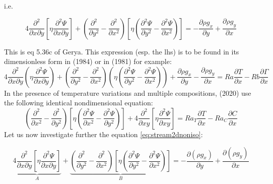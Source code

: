i.e.
\begin{mdframed}[backgroundcolor=blue!5]
\begin{equation}
4\frac{\partial^2 }{\partial x \partial y} 
\left[\eta \frac{\partial^2 \Psi}{\partial x \partial y}  \right]
+ 
\left( 
\frac{\partial^2 }{\partial y^2}
- \frac{\partial^2 }{\partial x^2}
\right)
\left[ \eta (\frac{\partial^2 \Psi}{\partial y^2}-\frac{\partial^2 \Psi}{\partial x^2}) \right]
=
- \frac{\partial \rho g_x}{\partial y}
+ \frac{\partial \rho g_y}{\partial x}
\label{eq:stream2dnoniso}
\end{equation}
\end{mdframed}
This is eq 5.36c of Gerya. 
This expression (esp. the lhs) is to be found in its dimensionless form in 
\textcite{chyu84} (1984) or in \textcite{scja81} (1981) for example:
\[
4\frac{\partial^2 }{\partial x \partial y} 
\left(\eta \frac{\partial^2 \Psi}{\partial x \partial y} 
\right)
+ 
\left( 
\frac{\partial^2 }{\partial y^2}
- \frac{\partial^2 }{\partial x^2}
\right)
\left( \eta (\frac{\partial^2 \Psi}{\partial y^2}-\frac{\partial^2 \Psi}{\partial x^2}) \right)
+ \frac{\partial \rho g_x}{\partial y}
- \frac{\partial \rho g_y}{\partial x}
=
Ra \frac{\partial T}{\partial x}
-Rb \frac{\partial \Gamma}{\partial x}
\]
In the presence of temperature variations and multiple compositions, 
\textcite{trlb20} (2020)  use the  following identical nondimensional equation:
\[
\left(
\frac{\partial^2 }{\partial x^2} - 
\frac{\partial^2 }{\partial y^2}  
\right)
\left[ \eta
\left(
\frac{\partial^2 \Psi}{\partial x^2} - 
\frac{\partial^2 \Psi}{\partial y^2}  
\right)
\right]
+4
\frac{\partial^2 }{\partial xy} 
\left[
\eta 
\frac{\partial^2 \Psi}{\partial xy} 
\right]
=
Ra_T \frac{\partial T}{\partial x}-
Ra_C \frac{\partial C}{\partial x}
\]
Let us now investigate further the equation \eqref{eq:stream2dnoniso}:

\[
\underbrace{
4\frac{\partial^2 }{\partial x \partial y} 
\left[\eta \frac{\partial^2 \Psi}{\partial x \partial y}  \right]}_{A}
+ 
\underbrace{
\left( 
\frac{\partial^2 }{\partial y^2}
- \frac{\partial^2 }{\partial x^2}
\right)
\left[ \eta (\frac{\partial^2 \Psi}{\partial y^2}-\frac{\partial^2 \Psi}{\partial x^2}) \right]}_{B}
=
- \frac{\partial (\rho g_x)}{\partial y}
+ \frac{\partial (\rho g_y)}{\partial x}
\]




